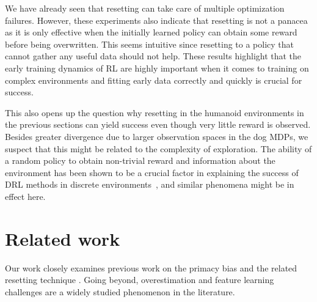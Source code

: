 We have already seen that resetting can take care of multiple optimization failures. However, these experiments also indicate that resetting is not a panacea as it is only effective when the initially learned policy can obtain some reward before being overwritten. 
This seems intuitive since resetting to a policy that cannot gather any useful data should not help. 
These results highlight that the early training dynamics of RL are highly important when it comes to training on complex environments and fitting early data correctly and quickly is crucial for success. 

This also opens up the question why resetting in the humanoid environments in the previous sections can yield success even though very little reward is observed. 
Besides greater divergence due to larger observation spaces in the dog MDPs, we suspect that this might be related to the complexity of exploration.
The ability of a random policy to obtain non-trivial reward and information about the environment has been shown to be a crucial factor in explaining the success of DRL methods in discrete environments~\parencite{laidlaw2023bridging}, and similar phenomena might be in effect here. 




\section{Related work}

Our work closely examines previous work on the primacy bias and the related resetting technique \parencite{anderson1992qlearning,nikishin2022primacy,doro2023barrier,schwarzer2023bigger}.
Going beyond, overestimation and feature learning challenges are a widely studied phenomenon in the literature.

